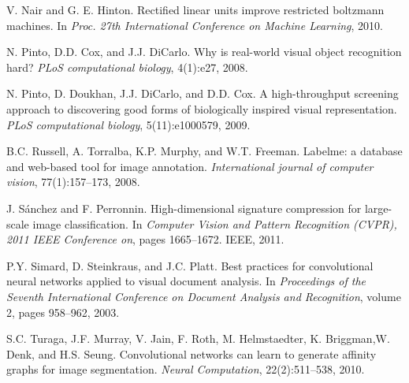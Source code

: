 \documentclass{article} %
\begin{document}
\begin{thebibliography}{99}
V. Nair and G. E. Hinton. Rectified linear units improve restricted boltzmann machines. In {\em Proc. 27th
International Conference on Machine Learning}, 2010.
\vspace{-1mm}

N. Pinto, D.D. Cox, and J.J. DiCarlo. Why is real-world visual object recognition hard? {\em PLoS computational
biology}, 4(1):e27, 2008.
\vspace{-1mm}

N. Pinto, D. Doukhan, J.J. DiCarlo, and D.D. Cox. A high-throughput screening approach to discovering
good forms of biologically inspired visual representation. {\em PLoS computational biology}, 5(11):e1000579,
2009.
\vspace{-1mm}

B.C. Russell, A. Torralba, K.P. Murphy, and W.T. Freeman. Labelme: a database and web-based tool for
image annotation. {\em International journal of computer vision}, 77(1):157–173, 2008.
\vspace{-1mm}

J. S\'{a}nchez and F. Perronnin. High-dimensional signature compression for large-scale image classification.
In {\em Computer Vision and Pattern Recognition (CVPR), 2011 IEEE Conference on}, pages 1665–1672. IEEE,
2011.
\vspace{-1mm}

P.Y. Simard, D. Steinkraus, and J.C. Platt. Best practices for convolutional neural networks applied to
visual document analysis. In {\em Proceedings of the Seventh International Conference on Document Analysis
and Recognition}, volume 2, pages 958–962, 2003.
\vspace{-1mm}

S.C. Turaga, J.F. Murray, V. Jain, F. Roth, M. Helmstaedter, K. Briggman,W. Denk, and H.S. Seung. Convolutional
networks can learn to generate affinity graphs for image segmentation. {\em Neural Computation},
22(2):511–538, 2010.
\vspace{-1mm}


\end{thebibliography}
\end{document}
